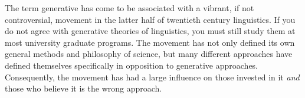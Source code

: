 

The term generative has come to be associated with a vibrant, if not controversial, movement in the latter half of twentieth century linguistics. If you do not agree with generative theories of linguistics, you must still study them at most university graduate programs. The movement has not only defined its own general methods and philosophy of science, but many different approaches have defined themselves specifically in opposition to generative approaches. Consequently, the movement has had a large influence on those invested in it \textsl{and} those who believe it is the wrong approach.   










